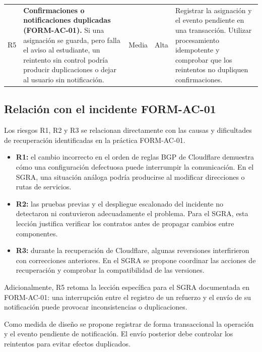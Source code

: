 \begin{longtable}{@{}p{}
p{}
p{}
p{}
p{}@{}}
\addlinespace[4pt]

R5 &
\textbf{Confirmaciones o notificaciones
duplicadas (FORM-AC-01).}
Si una asignación se guarda, pero falla el
aviso al estudiante, un reintento sin control
podría producir duplicaciones o dejar al
usuario sin notificación. &
Media &
Alta &
Registrar la asignación y el evento pendiente
en una transacción. Utilizar procesamiento
idempotente y comprobar que los reintentos
no dupliquen confirmaciones.\\

\end{longtable}
\endgroup

\subsection{Relación con el incidente FORM-AC-01}

Los riesgos R1, R2 y R3 se relacionan directamente con las causas y dificultades de recuperación identificadas en la práctica FORM-AC-01.

\begin{itemize}
    \item \textbf{R1:} el cambio incorrecto en el orden de reglas BGP de Cloudflare demuestra cómo una configuración defectuosa puede interrumpir la comunicación. En el SGRA, una situación análoga podría producirse al modificar direcciones o rutas de servicios.

    \item \textbf{R2:} las pruebas previas y el despliegue escalonado del incidente no detectaron ni contuvieron adecuadamente el problema. Para el SGRA, esta lección justifica verificar los contratos antes de propagar cambios entre componentes.

    \item \textbf{R3:} durante la recuperación de Cloudflare, algunas reversiones interfirieron con correcciones anteriores. En el SGRA se propone coordinar las acciones de recuperación y comprobar la compatibilidad de las versiones.
\end{itemize}

Adicionalmente, R5 retoma la lección específica para el SGRA documentada en FORM-AC-01: una interrupción entre el registro de un refuerzo y el envío de su notificación puede provocar inconsistencias o duplicaciones.

Como medida de diseño se propone registrar de forma transaccional la operación y el evento pendiente de notificación. El envío posterior debe controlar los reintentos para evitar efectos duplicados.

